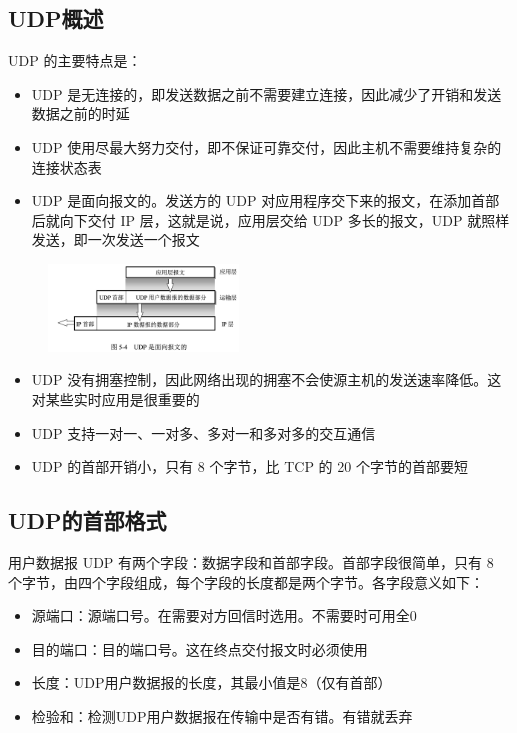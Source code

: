 \documentclass[cs4size,a4paper,10pt]{ctexart}
\begin{document}
	\subsection{UDP概述}

	UDP 的主要特点是：
	\begin{itemize}
		\item UDP 是无连接的，即发送数据之前不需要建立连接，因此减少了开销和发送数据之前的时延
		\item UDP 使用尽最大努力交付，即不保证可靠交付，因此主机不需要维持复杂的连接状态表
		\item UDP 是面向报文的。发送方的 UDP 对应用程序交下来的报文，在添加首部后就向下交付 IP 层，这就是说，应用层交给 UDP 多长的报文，UDP 就照样发送，即一次发送一个报文
	\end{itemize}

	\begin{figure}[H]
		\centering
		\includegraphics[width=0.45\textwidth]{img/5.4}
	\end{figure}

	\begin{itemize}
		\item UDP 没有拥塞控制，因此网络出现的拥塞不会使源主机的发送速率降低。这对某些实时应用是很重要的
		\item UDP 支持一对一、一对多、多对一和多对多的交互通信
		\item UDP 的首部开销小，只有 8 个字节，比 TCP 的 20 个字节的首部要短
	\end{itemize}

	\subsection{UDP的首部格式}
	用户数据报 UDP 有两个字段：数据字段和首部字段。首部字段很简单，只有 8 个字节，由四个字段组成，每个字段的长度都是两个字节。各字段意义如下：
	\begin{itemize}
		\item 源端口：源端口号。在需要对方回信时选用。不需要时可用全0
		\item 目的端口：目的端口号。这在终点交付报文时必须使用
		\item 长度：UDP用户数据报的长度，其最小值是8（仅有首部）
		\item 检验和：检测UDP用户数据报在传输中是否有错。有错就丢弃
	\end{itemize}
\end{document}
